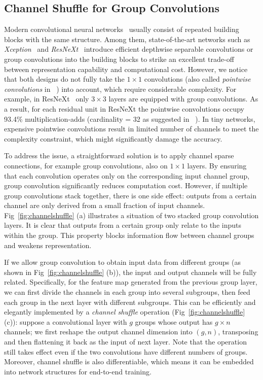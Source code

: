 \documentclass[10pt,twocolumn,letterpaper]{article}
\begin{document}
\subsection{Channel Shuffle for Group Convolutions}
\label{sec:channelshuffle}

Modern convolutional neural networks~\cite{simonyan2014very,szegedy2015going,szegedy2016rethinking,szegedy2016inception,he2016deep,he2016identity} usually consist of repeated building blocks with the same structure. Among them, state-of-the-art networks such as \emph{Xception}~\cite{chollet2016xception} and \emph{ResNeXt}~\cite{xie2016aggregated} introduce efficient depthwise separable convolutions or group convolutions into the building blocks to strike an excellent trade-off between representation capability and computational cost. However, we notice that both designs do not fully take the $1\times1$ convolutions (also called \emph{pointwise convolutions} in ~\cite{howard2017mobilenets}) into account, which require considerable complexity. For example, in ResNeXt~\cite{xie2016aggregated} only $3\times3$ layers are equipped with group convolutions. As a result, for each residual unit in ResNeXt the pointwise convolutions occupy 93.4\% multiplication-adds (cardinality = 32 as suggested in ~\cite{xie2016aggregated}). In tiny networks, expensive pointwise convolutions result in limited number of channels to meet the complexity constraint, which might significantly damage the accuracy.

To address the issue, a straightforward solution is to apply channel sparse connections, for example group convolutions, also on $1\times1$ layers. By ensuring that each convolution operates only on the corresponding input channel group, group convolution significantly reduces computation cost. However, if multiple group convolutions stack together, there is one side effect: outputs from a certain channel are only derived from a small fraction of input channels. Fig~\ref{fig:channelshuffle} (a) illustrates a situation of two stacked group convolution layers. It is clear that outputs from a certain group only relate to the inputs within the group. This property blocks information flow between channel groups and weakens representation.



If we allow group convolution to obtain input data from different groups (as shown in Fig~\ref{fig:channelshuffle} (b)), the input and output channels will be fully related. Specifically, for the feature map generated from the previous group layer, we can first divide the channels in each group into several subgroups, then feed each group in the next layer with different subgroups. This can be efficiently and elegantly implemented by a \emph{channel shuffle} operation (Fig~\ref{fig:channelshuffle} (c)): suppose a convolutional layer with $g$ groups whose output has $g\times n$ channels; we first reshape the output channel dimension into $(g, n)$, transposing and then flattening it back as the input of next layer. Note that the operation still takes effect even if the two convolutions have different numbers of groups. Moreover, channel shuffle is also differentiable, which means it can be embedded into network structures for end-to-end training.
\end{document}
